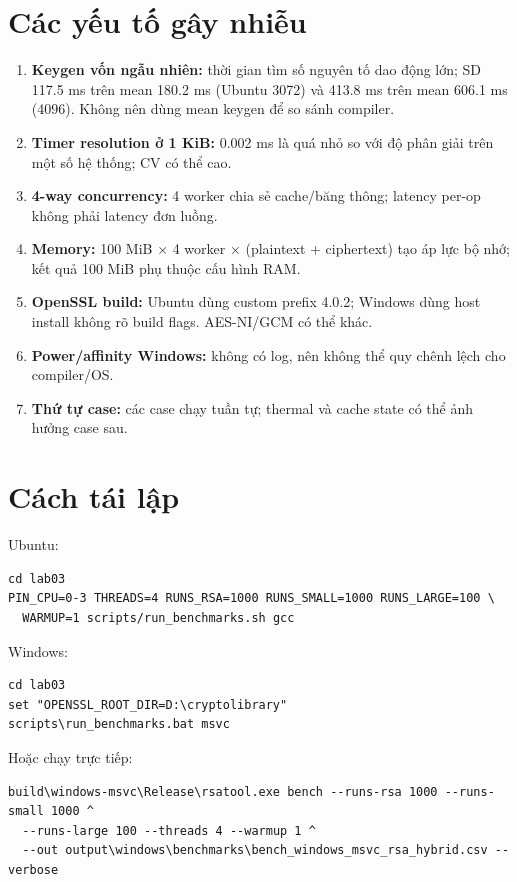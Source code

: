 \documentclass[12pt,a4paper,oneside]{report}
\let\origtexttt\texttt
\renewcommand{\texttt}[1]{\origtexttt{\seqsplit{#1}}}
\begin{document}
\section{Các yếu tố gây nhiễu}


\begin{enumerate}[leftmargin=*]
\item \textbf{Keygen vốn ngẫu nhiên:} thời gian tìm số nguyên tố dao động lớn; SD 117.5 ms trên mean 180.2 ms (Ubuntu 3072) và 413.8 ms trên mean 606.1 ms (4096). Không nên dùng mean keygen để so sánh compiler.
\item \textbf{Timer resolution ở 1 KiB:} 0.002 ms là quá nhỏ so với độ phân giải \texttt{high\_resolution\_clock} trên một số hệ thống; CV có thể cao.
\item \textbf{4-way concurrency:} 4 worker chia sẻ cache/băng thông; latency per-op không phải latency đơn luồng.
\item \textbf{Memory:} 100 MiB × 4 worker × (plaintext + ciphertext) tạo áp lực bộ nhớ; kết quả 100 MiB phụ thuộc cấu hình RAM.
\item \textbf{OpenSSL build:} Ubuntu dùng custom prefix 4.0.2; Windows dùng host install không rõ build flags. AES-NI/GCM có thể khác.
\item \textbf{Power/affinity Windows:} không có log, nên không thể quy chênh lệch cho compiler/OS.
\item \textbf{Thứ tự case:} các case chạy tuần tự; thermal và cache state có thể ảnh hưởng case sau.
\end{enumerate}


\section{Cách tái lập}


Ubuntu:


\begin{Verbatim}
cd lab03
PIN_CPU=0-3 THREADS=4 RUNS_RSA=1000 RUNS_SMALL=1000 RUNS_LARGE=100 \
  WARMUP=1 scripts/run_benchmarks.sh gcc
\end{Verbatim}


Windows:


\begin{Verbatim}
cd lab03
set "OPENSSL_ROOT_DIR=D:\cryptolibrary"
scripts\run_benchmarks.bat msvc
\end{Verbatim}


Hoặc chạy trực tiếp:


\begin{Verbatim}
build\windows-msvc\Release\rsatool.exe bench --runs-rsa 1000 --runs-small 1000 ^
  --runs-large 100 --threads 4 --warmup 1 ^
  --out output\windows\benchmarks\bench_windows_msvc_rsa_hybrid.csv --verbose
\end{Verbatim}
\end{document}
